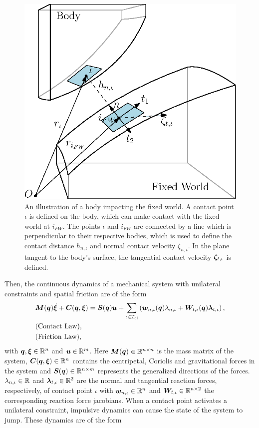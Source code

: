 \documentclass[../DC2017114Bouma.tex]{subfiles}
\begin{document}
\begin{figure}[h]
\centering
\includegraphics[width=.5\textwidth]{contactplanes.eps}\caption{An illustration of a body impacting the fixed world. A contact point $\iota$ is defined on the body, which can make contact with the fixed world at $i_{FW}$. The points $\iota$ and $i_{FW}$ are connected by a line which is perpendicular to their respective bodies, which is used to define the contact distance $h_{n,\iota}$ and normal contact velocity $\zeta_{n,\iota}$. In the plane tangent to the body's surface, the tangential contact velocity $\boldsymbol{\zeta}_{t,\iota}$ is defined.} \label{fig:contactplanes}
\end{figure}

Then, the continuous dynamics of a mechanical system with unilateral constraints and spatial friction are of the form
\begin{align}
&{\boldsymbol{M}}({\boldsymbol{q}})\dot{\boldsymbol{\xi}} + {\boldsymbol{C}}({\boldsymbol{q}},\boldsymbol{\xi}) = {\boldsymbol{S}}({\boldsymbol{q}}){\boldsymbol{u}} + \sum_{\iota\in\mathcal{I}_{\text{cl}}}\left({\boldsymbol{w}}_{n,\iota}({\boldsymbol{q}})\lambda_{n,\iota} + {\boldsymbol{W}}_{t,\iota}({\boldsymbol{q}})\boldsymbol{\lambda}_{t,\iota} \right), \label{eq:appcont1}\\
&\text{(Contact Law)},\label{eq:appcont2}\\
&\text{(Friction Law)},\label{eq:appcont3}
\end{align}
%
%
%
%
%
%
%
with ${\boldsymbol{q}},\boldsymbol{\xi}\in\mathbb{R}^{n}$ and ${\boldsymbol{u}}\in\mathbb{R}^m$. Here ${\boldsymbol{M}}({\boldsymbol{q}})\in\mathbb{R}^{n\times n}$ is the mass matrix of the system, ${\boldsymbol{C}}({\boldsymbol{q}},\boldsymbol{\xi})\in\mathbb{R}^{n}$ contains the centripetal, Coriolis and gravitational forces in the system and ${\boldsymbol{S}}({\boldsymbol{q}})\in\mathbb{R}^{n\times m}$ represents the generalized directions of the forces. $\lambda_{n,\iota}\in\mathbb{R}$ and $\boldsymbol{\lambda}_{t,\iota}\in\mathbb{R}^{2}$ are the normal and tangential reaction forces, respectively, of contact point $\iota$ with ${\boldsymbol{w}}_{n,\iota}\in\mathbb{R}^{n}$ and ${\boldsymbol{W}}_{t,\iota}\in\mathbb{R}^{n\times 2}$ the corresponding reaction force jacobians. When a contact point activates a unilateral constraint, impulsive dynamics can cause the state of the system to jump. These dynamics are of the form
\end{document}
